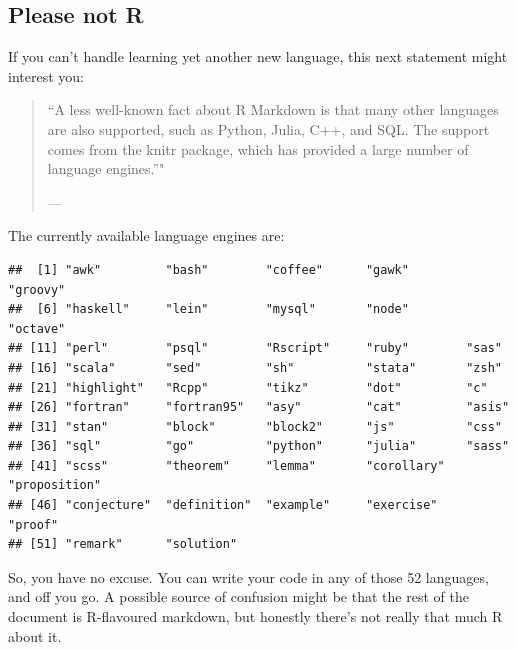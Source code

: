 \documentclass[11pt,]{article}
\newenvironment{Shaded}{\begin{snugshade}}{\end{snugshade}}
\newcommand{\KeywordTok}[1]{\textcolor[rgb]{0.13,0.29,0.53}{\textbf{#1}}}
\newcommand{\NormalTok}[1]{#1}
\newcommand{\OperatorTok}[1]{\textcolor[rgb]{0.81,0.36,0.00}{\textbf{#1}}}
\begin{document}
\hypertarget{pleaseNotR}{%
\subsection{Please not R}\label{pleaseNotR}}

If you can't handle learning yet another new language, this next statement might interest you:

\begin{quote}
``A less well-known fact about R Markdown is that many other languages are also supported, such as Python, Julia, C++, and SQL. The support comes from the knitr package, which has provided a large number of language engines.''"

--- \citet{R-Markdown-Guide}
\end{quote}

The currently available language engines are:

\begin{Shaded}
\end{Shaded}

\begin{verbatim}
##  [1] "awk"         "bash"        "coffee"      "gawk"        "groovy"     
##  [6] "haskell"     "lein"        "mysql"       "node"        "octave"     
## [11] "perl"        "psql"        "Rscript"     "ruby"        "sas"        
## [16] "scala"       "sed"         "sh"          "stata"       "zsh"        
## [21] "highlight"   "Rcpp"        "tikz"        "dot"         "c"          
## [26] "fortran"     "fortran95"   "asy"         "cat"         "asis"       
## [31] "stan"        "block"       "block2"      "js"          "css"        
## [36] "sql"         "go"          "python"      "julia"       "sass"       
## [41] "scss"        "theorem"     "lemma"       "corollary"   "proposition"
## [46] "conjecture"  "definition"  "example"     "exercise"    "proof"      
## [51] "remark"      "solution"
\end{verbatim}

So, you have no excuse. You can write your code in any of those 52 languages, and off you go. A possible source of confusion might be that the rest of the document is R-flavoured markdown, but honestly there's not really that much R about it.
\end{document}
